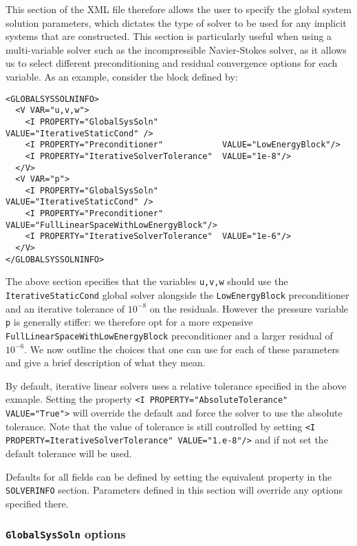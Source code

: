 This section of the XML file therefore allows the user to specify the global
system solution parameters, which dictates the type of solver to be used for any
implicit systems that are constructed. This section is particularly useful when
using a multi-variable solver such as the incompressible Navier-Stokes solver,
as it allows us to select different preconditioning and residual convergence
options for each variable. As an example, consider the block defined by:

\begin{lstlisting}[style=XMLStyle]
<GLOBALSYSSOLNINFO>
  <V VAR="u,v,w">
    <I PROPERTY="GlobalSysSoln"             VALUE="IterativeStaticCond" />
    <I PROPERTY="Preconditioner"            VALUE="LowEnergyBlock"/>
    <I PROPERTY="IterativeSolverTolerance"  VALUE="1e-8"/>
  </V>
  <V VAR="p">
    <I PROPERTY="GlobalSysSoln"             VALUE="IterativeStaticCond" />
    <I PROPERTY="Preconditioner"     VALUE="FullLinearSpaceWithLowEnergyBlock"/>
    <I PROPERTY="IterativeSolverTolerance"  VALUE="1e-6"/>
  </V>
</GLOBALSYSSOLNINFO>
\end{lstlisting}

The above section specifies that the variables \texttt{u,v,w} should use the
\texttt{IterativeStaticCond} global solver alongside the \texttt{LowEnergyBlock}
preconditioner and an iterative tolerance of $10^{-8}$ on the residuals. However
the pressure variable \texttt{p} is generally stiffer: we therefore opt for a
more expensive \texttt{FullLinearSpaceWithLowEnergyBlock} preconditioner and a
larger residual of $10^{-6}$. We now outline the choices that one can use for
each of these parameters and give a brief description of what they mean.

By default, iterative linear solvers uses a relative tolerance specified in the
above exmaple. Setting the property \texttt{<I PROPERTY="AbsoluteTolerance" VALUE="True">}
will override the default and force the solver to use the absolute tolerance.
Note that the value of tolerance is still
controlled by setting \texttt{<I PROPERTY=IterativeSolverTolerance" VALUE="1.e-8"/>}
and if not set the default tolerance will be used.

Defaults for all fields can be defined by setting the equivalent property in
the \texttt{SOLVERINFO} section. Parameters defined in this section will
override any options specified there.


\subsubsection{\texttt{GlobalSysSoln} options}

